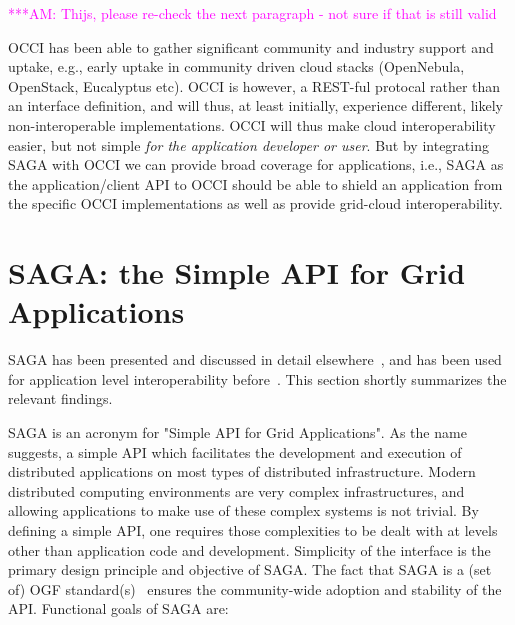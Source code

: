 \documentclass[10pt,conference,final,letterpaper,twoside,twocolumn,]{IEEEtran}
\newcommand{\amnote}[1]{  {\textcolor{magenta} {***AM: #1}}}
\newcommand{\amnote}[1]{}
\begin{document}
 


 \amnote{Thijs, please re-check the next paragraph - not sure if that
 is still valid}

 OCCI has been able to gather significant community and industry
 support and uptake, e.g., early uptake in community driven cloud
 stacks (OpenNebula, OpenStack, Eucalyptus etc).  OCCI is however, a
 REST-ful protocal rather than an interface definition, and will thus,
 at least initially, experience different, likely non-interoperable
 implementations.  OCCI will thus make cloud interoperability easier,
 but not simple {\it for the application developer or user}.  But by
 integrating SAGA with OCCI we can provide broad coverage for
 applications, i.e., SAGA as the application/client API to OCCI should
 be able to shield an application from the specific OCCI
 implementations as well as provide grid-cloud interoperability.


\section{SAGA: the Simple API for Grid Applications}
\label{sec:saga}

 SAGA has been presented and discussed in detail
 elsewhere~\cite{sagapub...}, and has been used for application level
 interoperability before~\cite{sagainterop...}.  This section shortly
 summarizes the relevant findings.

 SAGA is an acronym for "Simple API for Grid Applications". As the
 name suggests, a simple API which facilitates the development and
 execution of distributed applications on most types of distributed
 infrastructure.  Modern distributed computing environments are very
 complex infrastructures, and allowing applications to make use of
 these complex systems is not trivial.  By defining a simple API, one
 requires those complexities to be dealt with at levels other than
 application code and development.  Simplicity of the interface is the
 primary design principle and objective of SAGA.  The fact that SAGA
 is a (set of) OGF standard(s)~\cite{sagaspecs...} ensures the
 community-wide adoption and stability of the API.  Functional goals
 of SAGA are:
\end{document}
